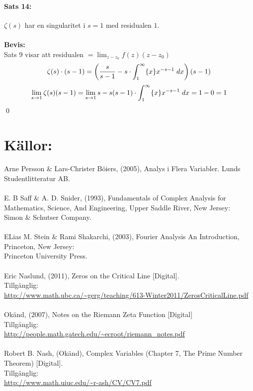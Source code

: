 \paragraph{Sats 14:} $\zeta(s)$ har en singularitet i $s = 1$ med residualen $1$.\\
\\
{\bf Bevis:}\\
Sats 9 visar att residualen $= \lim_{z - z_0} f(z)(z - z_0)$
\[
	\zeta(s) \cdot (s - 1) = \left (
		\frac {s} {s - 1} - s \cdot \int_1^\infty \{x\} x^{-s - 1} \; dx 
		\right )
	(s - 1)
\]
\[
	\lim_{s \to 1} \zeta(s)(s - 1) = \lim_{s \to 1} s - s (s - 1) \cdot \int_1^\infty \{x\} x^{-s - 1} \; dx =
		1 - 0 = 1
\]
\hfill \qed
\pagebreak
\section*{Källor:}
Arne Persson \& Lars-Christer Böiers, (2005), Analys i Flera Variabler. Lunds Studentlitteratur AB.\\
\\
E. B Saff \& A. D. Snider, (1993), Fundamentals of Complex Analysis for Mathematics, Science, And Engineering,
Upper Saddle River, New Jersey:\\
Simon \& Schutser Company.\\
\\
ELias M. Stein \& Rami Shakarchi, (2003), Fourier Analysis An Introduction, Princeton, New Jersey:\\
Princeton University Press.\\
\\
Eric Naslund, (2011), Zeros on the Critical Line [Digital].\\
Tillgänglig:\\
\url{http://www.math.ubc.ca/~gerg/teaching/613-Winter2011/ZerosCriticalLine.pdf}\\
\\
Okänd, (2007), Notes on the Riemann Zeta Function [Digital]\\
Tillgänglig:\\
\url{http://people.math.gatech.edu/~ecroot/riemann\_notes.pdf}\\
\\
Robert B. Nash, (Okänd), Complex Variables (Chapter 7, The Prime Number Theorem) [Digital].\\
Tillgänglig:\\
\url{http://www.math.uiuc.edu/~r-ash/CV/CV7.pdf}



